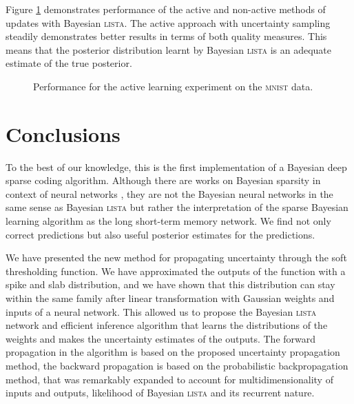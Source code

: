 \documentclass{article}
\begin{document}
Figure \ref{fig:active_learning_mnist} demonstrates performance of the active and non-active methods of updates with Bayesian \textsc{lista}. The active approach with uncertainty sampling steadily demonstrates better results in terms of both quality measures. This means that the posterior distribution learnt by Bayesian \textsc{lista} is an adequate estimate of the true posterior.
\begin{figure}[h]
\centering
{}%
\caption{Performance for the active learning experiment on the \textsc{mnist} data. }
\label{fig:active_learning_mnist}
\end{figure}

\section{Conclusions}
\label{sec:conclusions}
To the best of our knowledge, this is the first implementation of a Bayesian deep sparse coding algorithm. Although there are works on Bayesian sparsity in context of neural networks \cite{he2017bayesian}, they are not the Bayesian neural networks in the same sense as Bayesian \textsc{lista} but rather the interpretation of the sparse Bayesian  learning algorithm as the long short-term memory network. We find not only correct predictions but also useful posterior estimates for the predictions.

We have presented the new method for propagating uncertainty through the soft thresholding function. %
We have approximated the outputs of the function with a spike and slab distribution, and we have shown that this distribution can stay within the same family after linear transformation with Gaussian weights and inputs of a neural network. This allowed us to propose the Bayesian \textsc{lista} network and efficient inference algorithm that learns the distributions of the weights and makes the uncertainty estimates of the outputs. The forward propagation in the algorithm is based on the proposed uncertainty propagation method, the backward propagation is based on the probabilistic backpropagation method, that was remarkably expanded to account for multidimensionality of inputs and outputs, likelihood of Bayesian \textsc{lista} and its recurrent nature.
\end{document}

